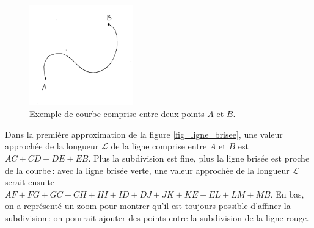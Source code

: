 	\begin{figure}
		\includegraphics[width=0.4\textwidth]{image/pi_nombre/courbe1.jpg}
		\caption{Exemple de courbe comprise entre deux points $A$ et $B$.}	\label{fig_courbe}
	\end{figure} 

	Dans la première approximation de la figure \ref{fig_ligne_brisee}, une valeur approchée de la longueur $\mathscr{L}$ de la ligne comprise entre $A$ et $B$ est $AC+CD+DE+EB$. Plus la subdivision est fine, plus la ligne brisée est proche de la courbe\,: avec la ligne brisée verte, une valeur approchée de la longueur $\mathscr{L}$ serait ensuite $AF+FG+GC+CH+HI+ID+DJ+JK+KE+EL+LM+MB$. En bas, on a représenté un zoom pour montrer qu'il est toujours possible d'affiner la subdivision\,: on pourrait ajouter des points entre la subdivision de la ligne rouge.

